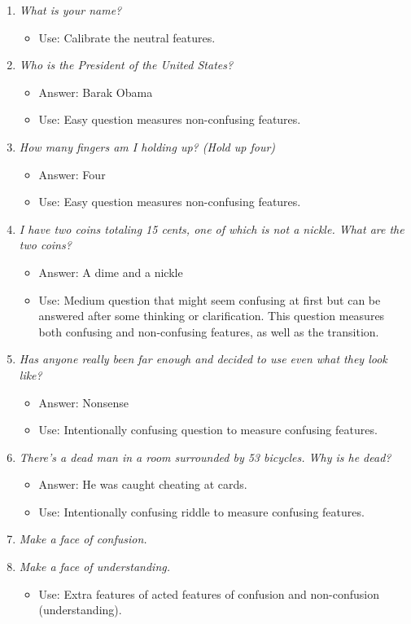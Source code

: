 \documentclass[12pt,letterpaper]{article}
\begin{document}
\begin{enumerate}
\item \emph{What is your name?}
\begin{itemize}
\item Use: Calibrate the neutral features. 
\end{itemize}
 
\item \emph{Who is the President of the United States?}
\begin{itemize}
\item Answer: Barak Obama
\item Use: Easy question measures non-confusing features. 
\end{itemize}

\item \emph{How many fingers am I holding up? (Hold up four)}
\begin{itemize}
\item Answer: Four
\item Use: Easy question measures non-confusing features. 
\end{itemize}

\item \emph{I have two coins totaling 15 cents, one of which is not a nickle. What are the two coins?}
\begin{itemize}
\item Answer: A dime and a nickle
\item Use: Medium question that might seem confusing at first but can be answered after some thinking or clarification. This question measures both confusing and non-confusing features, as well as the transition.
\end{itemize}

\item \emph{Has anyone really been far enough and decided to use even what they look like?}
\begin{itemize}
\item Answer: Nonsense
\item Use: Intentionally confusing question to measure confusing features.
\end{itemize}

\item \emph{There’s a dead man in a room surrounded by 53 bicycles. Why is he dead?}
\begin{itemize}
\item Answer: He was caught cheating at cards.
\item Use: Intentionally confusing riddle to measure confusing features.
\end{itemize}

\item \emph{Make a face of confusion.}
\item \emph{Make a face of understanding.}
\begin{itemize}
\item Use: Extra features of acted features of confusion and non-confusion (understanding). 
\end{itemize}
\end{enumerate}
\end{document}
